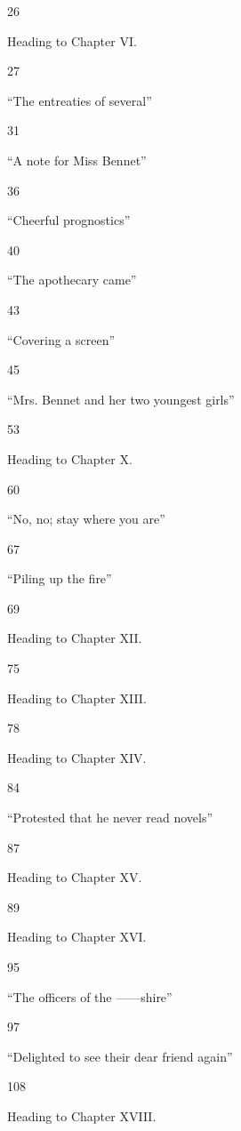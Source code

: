 \documentclass[10pt]{book}
\begin{document}
       26
      

      Heading to Chapter VI.
     

       27
      

      “The entreaties of several”
     

       31
      

      “A note for Miss Bennet”
     

       36
      

      “Cheerful prognostics”
     

       40
      

      “The apothecary came”
     

       43
      

      “Covering a screen”
     

       45
      

      “Mrs. Bennet and her two youngest girls”
     

       53
      

      Heading to Chapter X.
     

       60
      

      “No, no; stay where you are”
     

       67
      

      “Piling up the fire”
     

       69
      

      Heading to Chapter XII.
     

       75
      

      Heading to Chapter XIII.
     

       78
      

      Heading to Chapter XIV.
     

       84
      

      “Protested that he never read novels”
     

       87
      

      Heading to Chapter XV.
     

       89
      

      Heading to Chapter XVI.
     

       95
      

      “The officers of the ——shire”
     

       97
      

      “Delighted to see their dear friend again”
     

       108
      

      Heading to Chapter XVIII.
     
\end{document}
